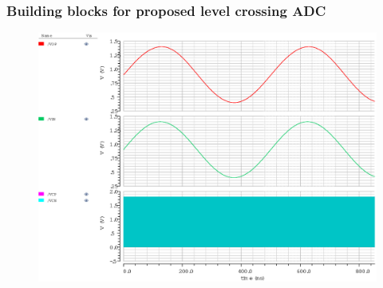 \begin{frame}
	\frametitle{Building blocks for proposed level crossing ADC} \footnotesize
	\begin{center}
		\begin{figure}
			\includegraphics[width=10 cm, height=6 cm,angle=360]{Figures/STAH.eps}\\
		\end{figure}
		\scriptsize{ \color{blue}{Simulation results of Track and Hold used in proposed ADC architecture}}
	\end{center}
\end{frame}
